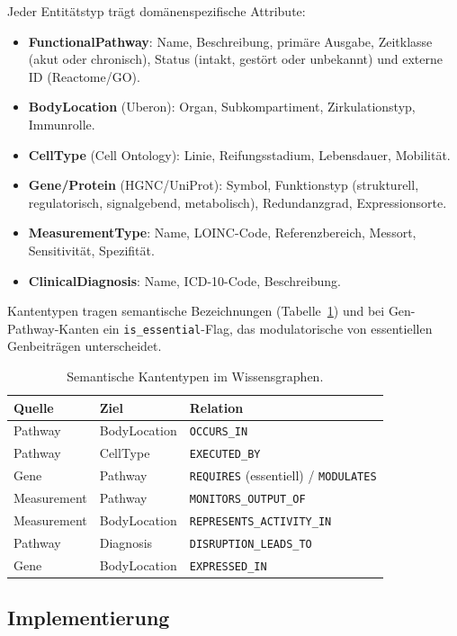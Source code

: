 \documentclass[12pt,a4paper]{article}
\begin{document}
Jeder Entitätstyp trägt domänenspezifische Attribute:

\begin{itemize}
    \item \textbf{FunctionalPathway}: Name, Beschreibung, primäre Ausgabe, Zeitklasse (akut oder chronisch), Status (intakt, gestört oder unbekannt) und externe ID (Reactome/GO).
    \item \textbf{BodyLocation} (Uberon): Organ, Subkompartiment, Zirkulationstyp, Immunrolle.
    \item \textbf{CellType} (Cell Ontology): Linie, Reifungsstadium, Lebensdauer, Mobilität.
    \item \textbf{Gene/Protein} (HGNC/UniProt): Symbol, Funktionstyp (strukturell, regulatorisch, signalgebend, metabolisch), Redundanzgrad, Expressionsorte.
    \item \textbf{MeasurementType}: Name, LOINC-Code, Referenzbereich, Messort, Sensitivität, Spezifität.
    \item \textbf{ClinicalDiagnosis}: Name, ICD-10-Code, Beschreibung.
\end{itemize}

Kantentypen tragen semantische Bezeichnungen (Tabelle~\ref{tab:edges}) und bei Gen-Pathway-Kanten ein \texttt{is\_essential}-Flag, das modulatorische von essentiellen Genbeiträgen unterscheidet.

\begin{table}[H]
\centering
\caption{Semantische Kantentypen im Wissensgraphen.}
\label{tab:edges}
\begin{tabular}{lll}
\toprule
\textbf{Quelle} & \textbf{Ziel} & \textbf{Relation} \\
\midrule
Pathway & BodyLocation & \texttt{OCCURS\_IN} \\
Pathway & CellType & \texttt{EXECUTED\_BY} \\
Gene & Pathway & \texttt{REQUIRES} (essentiell) / \texttt{MODULATES} \\
Measurement & Pathway & \texttt{MONITORS\_OUTPUT\_OF} \\
Measurement & BodyLocation & \texttt{REPRESENTS\_ACTIVITY\_IN} \\
Pathway & Diagnosis & \texttt{DISRUPTION\_LEADS\_TO} \\
Gene & BodyLocation & \texttt{EXPRESSED\_IN} \\
\bottomrule
\end{tabular}
\end{table}

\subsection{Implementierung}
\label{sec:implementation}
\end{document}

